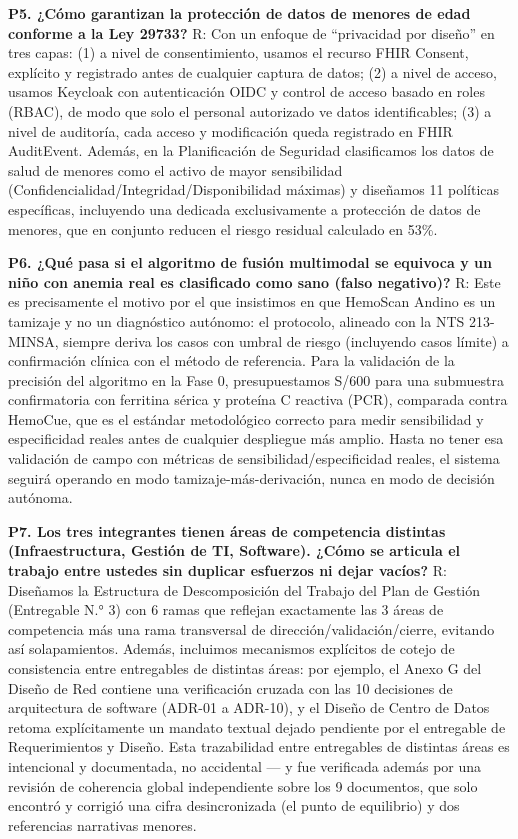 \documentclass[11pt,a4paper]{article}
\begin{document}
\textbf{P5. ¿Cómo garantizan la protección de datos de menores de edad conforme a la Ley 29733?}
R: Con un enfoque de ``privacidad por diseño'' en tres capas: (1) a nivel de consentimiento, usamos el recurso FHIR Consent, explícito y registrado antes de cualquier captura de datos; (2) a nivel de acceso, usamos Keycloak con autenticación OIDC y control de acceso basado en roles (RBAC), de modo que solo el personal autorizado ve datos identificables; (3) a nivel de auditoría, cada acceso y modificación queda registrado en FHIR AuditEvent. Además, en la Planificación de Seguridad clasificamos los datos de salud de menores como el activo de mayor sensibilidad (Confidencialidad/Integridad/Disponibilidad máximas) y diseñamos 11 políticas específicas, incluyendo una dedicada exclusivamente a protección de datos de menores, que en conjunto reducen el riesgo residual calculado en 53\%.

\textbf{P6. ¿Qué pasa si el algoritmo de fusión multimodal se equivoca y un niño con anemia real es clasificado como sano (falso negativo)?}
R: Este es precisamente el motivo por el que insistimos en que HemoScan Andino es un tamizaje y no un diagnóstico autónomo: el protocolo, alineado con la NTS 213-MINSA, siempre deriva los casos con umbral de riesgo (incluyendo casos límite) a confirmación clínica con el método de referencia. Para la validación de la precisión del algoritmo en la Fase 0, presupuestamos S/600 para una submuestra confirmatoria con ferritina sérica y proteína C reactiva (PCR), comparada contra HemoCue, que es el estándar metodológico correcto para medir sensibilidad y especificidad reales antes de cualquier despliegue más amplio. Hasta no tener esa validación de campo con métricas de sensibilidad/especificidad reales, el sistema seguirá operando en modo tamizaje-más-derivación, nunca en modo de decisión autónoma.

\textbf{P7. Los tres integrantes tienen áreas de competencia distintas (Infraestructura, Gestión de TI, Software). ¿Cómo se articula el trabajo entre ustedes sin duplicar esfuerzos ni dejar vacíos?}
R: Diseñamos la Estructura de Descomposición del Trabajo del Plan de Gestión (Entregable N.° 3) con 6 ramas que reflejan exactamente las 3 áreas de competencia más una rama transversal de dirección/validación/cierre, evitando así solapamientos. Además, incluimos mecanismos explícitos de cotejo de consistencia entre entregables de distintas áreas: por ejemplo, el Anexo G del Diseño de Red contiene una verificación cruzada con las 10 decisiones de arquitectura de software (ADR-01 a ADR-10), y el Diseño de Centro de Datos retoma explícitamente un mandato textual dejado pendiente por el entregable de Requerimientos y Diseño. Esta trazabilidad entre entregables de distintas áreas es intencional y documentada, no accidental --- y fue verificada además por una revisión de coherencia global independiente sobre los 9 documentos, que solo encontró y corrigió una cifra desincronizada (el punto de equilibrio) y dos referencias narrativas menores.
\end{document}

